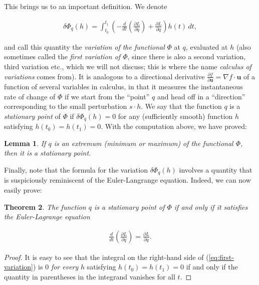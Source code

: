 \documentclass[11pt]{report}
\theoremstyle{plain}
\newtheorem{thm}{Theorem}[chapter]
\newtheorem{lem}[thm]{Lemma}
\theoremstyle{definition}
\begin{document}
This brings us to an important definition. We denote

\begin{equation*} \tag{15}\label{eq:first-variation}
\begin{split}
\delta\Phi_q(h) = \int_{t_0}^{t_1} \left(-\frac{d}{dt}\left(\frac{\partial L}{\partial \dot{q}}\right) + \frac{\partial L}{\partial q} \right)h(t)\,dt,
\end{split}
\end{equation*}

and call this quantity the \emph{variation of the
functional} $\Phi$ at $q$, evaluated at $h$ (also
sometimes called the \emph{first variation of $\Phi$},
since there is also a second variation, third
variation etc., which we will not discuss; this is
where the name \emph{calculus of variations} comes from).
It is analogous to a directional derivative
$\frac{\partial f}{\partial \mathbf{u}} = \nabla f
\cdot \mathbf{u}$
of a function of several variables in calculus, in
that it measures the instantaneous rate of change of
$\Phi$ if we start from the ``point'' $q$ and head
off in a ``direction'' corresponding to the small
perturbation $s\cdot h$. We say that the function $q$
is a \emph{stationary point} of $\Phi$ if
$\delta\Phi_q(h) = 0$ for any (sufficiently smooth)
function $h$ satisfying $h(t_0)=h(t_1)=0$. With the
computation above, we have proved:

\begin{lem}
If $q$ is an extremum (minimum or maximum) of the
functional $\Phi$, then it is a stationary point.
\end{lem}

Finally, note that the formula for the variation
$\delta \Phi_q(h)$ involves a quantity that is
suspiciously reminiscent of the Euler-Langrange
equation. Indeed, we can now easily prove:

\begin{thm}
The function $q$ is a stationary point of $\Phi$ if
and only if it satisfies the Euler-Lagrange equation

\begin{align*}
\frac{d}{dt}\left( \frac{\partial L}{\partial \dot{q}} \right) = \frac{\partial L}{\partial q}.
\end{align*}

\end{thm}

\begin{proof}
It is easy to see that the integral on the right-hand
side of (\ref{eq:first-variation}) is $0$ \emph{for every} $h$
satisfying $h(t_0)=h(t_1)=0$ if and only if the
quantity in parentheses in the integrand vanishes for
all $t$.
\end{proof}
\end{document}
